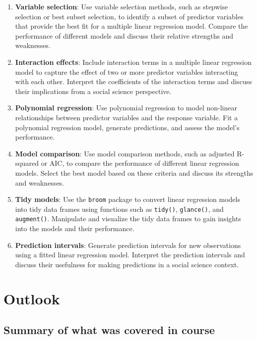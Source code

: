 \documentclass[
]{book}
\providecommand{\tightlist}{%
  \setlength{\itemsep}{0pt}\setlength{\parskip}{0pt}}
\begin{document}
\begin{enumerate}
\def\labelenumi{\arabic{enumi}.}
\tightlist
\item
  \textbf{Variable selection}: Use variable selection methods, such as stepwise selection or best subset selection, to identify a subset of predictor variables that provide the best fit for a multiple linear regression model. Compare the performance of different models and discuss their relative strengths and weaknesses.
\item
  \textbf{Interaction effects}: Include interaction terms in a multiple linear regression model to capture the effect of two or more predictor variables interacting with each other. Interpret the coefficients of the interaction terms and discuss their implications from a social science perspective.
\item
  \textbf{Polynomial regression}: Use polynomial regression to model non-linear relationships between predictor variables and the response variable. Fit a polynomial regression model, generate predictions, and assess the model's performance.
\item
  \textbf{Model comparison}: Use model comparison methods, such as adjusted R-squared or AIC, to compare the performance of different linear regression models. Select the best model based on these criteria and discuss its strengths and weaknesses.
\item
  \textbf{Tidy models}: Use the \texttt{broom} package to convert linear regression models into tidy data frames using functions such as \texttt{tidy()}, \texttt{glance()}, and \texttt{augment()}. Manipulate and visualize the tidy data frames to gain insights into the models and their performance.
\item
  \textbf{Prediction intervals}: Generate prediction intervals for new observations using a fitted linear regression model. Interpret the prediction intervals and discuss their usefulness for making predictions in a social science context.
\end{enumerate}

\hypertarget{out-look}{%
\chapter{Outlook}\label{out-look}}

\hypertarget{summary-of-what-was-covered-in-course}{%
\section{Summary of what was covered in course}\label{summary-of-what-was-covered-in-course}}
\end{document}
